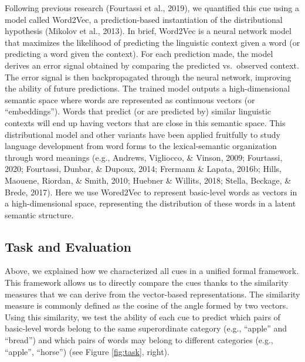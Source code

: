 \documentclass[english,,man]{apa6}
\begin{document}
Following previous research (Fourtassi et al., 2019), we quantified this cue using a model called Word2Vec, a prediction-based instantiation of the distributional hypothesis (Mikolov et al., 2013). In brief, Word2Vec is a neural network model that maximizes the likelihood of predicting the linguistic context given a word (or predicting a word given the context). For each prediction made, the model derives an error signal obtained by comparing the predicted vs.~observed context. The error signal is then backpropagated through the neural network, improving the ability of future predictions. The trained model outputs a high-dimensional semantic space where words are represented as continuous vectors (or \enquote{embeddings}). Words that predict (or are predicted by) similar linguistic contexts will end up having vectors that are close in this semantic space. This distributional model and other variants have been applied fruitfully to study language development from word forms to the lexical-semantic organization through word meanings (e.g., Andrews, Vigliocco, \& Vinson, 2009; Fourtassi, 2020; Fourtassi, Dunbar, \& Dupoux, 2014; Frermann \& Lapata, 2016b; Hills, Maouene, Riordan, \& Smith, 2010; Huebner \& Willits, 2018; Stella, Beckage, \& Brede, 2017). Here we use Wored2Vec to represent basic-level words as vectors in a high-dimensional space, representing the distribution of these words in a latent semantic structure.

\hypertarget{task-and-evaluation}{%
\subsection{Task and Evaluation}\label{task-and-evaluation}}

Above, we explained how we characterized all cues in a unified formal framework. This framework allows us to directly compare the cues thanks to the similarity measures that we can derive from the vector-based representations. The similarity measure is commonly defined as the cosine of the angle formed by two vectors. Using this similarity, we test the ability of each cue to predict which pairs of basic-level words belong to the same superordinate category (e.g., \enquote{apple} and \enquote{bread}) and which pairs of words may belong to different categories (e.g., \enquote{apple}, \enquote{horse}) (see Figure \ref{fig:task}, right).
\end{document}

